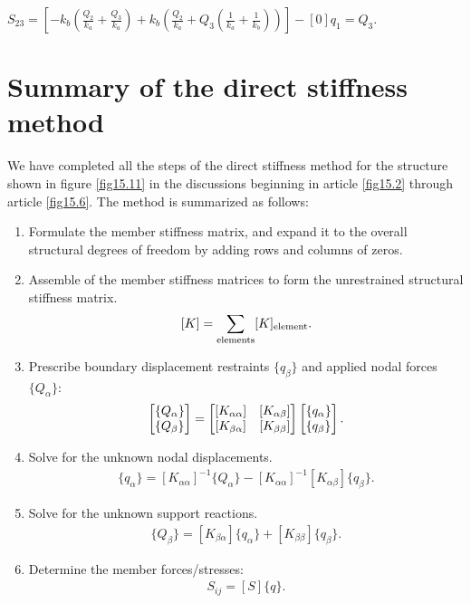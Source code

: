 \documentclass{AeroStructure-ERJohnson}
\begin{document}
$S_{23}=\left[-k_{b}\left(\frac{Q_{2}}{k_{a}}+\frac{Q_{3}}{k_{a}}\right)+k_{b}\left(\frac{Q_{2}}{k_{a}}+Q_{3}\left(\frac{1}{k_{a}}+\frac{1}{k_{b}}\right)\right)\right]-[0] q_{1}=Q_{3}$.

\section{Summary of the direct stiffness method}\label{sec15.7}
We have completed all the steps of the direct stiffness method for the structure shown in figure \ref{fig15.11} in the discussions beginning in article \ref{fig15.2} through article \ref{fig15.6}. The method is summarized as follows:
\begin{enumerate}
\item Formulate the member stiffness matrix, and expand it to the overall structural degrees of freedom by adding rows and columns of zeros.

\item Assemble of the member stiffness matrices to form the unrestrained structural stiffness matrix.
\begin{align}\label{eq15.47}
[K]=\sum_{{\rm elements }}[K]_{{\rm element}}.
\end{align}
\item Prescribe boundary displacement restraints $\{q_{\beta}\}$ and applied nodal forces $\{Q_{\alpha}\}$:
\begin{align}\label{eq15.48}
\left[\begin{array}{@{}l@{}} \{Q_{\alpha}\} \\ \{Q_{\beta}\}\end{array}\right]
=
\left[\begin{array}{@{}cc@{}} [K_{\alpha \alpha}] & [K_{\alpha \beta}] \\
{[}K_{\beta \alpha}] & [K_{\beta \beta}]\end{array}\right]
\left[
\begin{array}{@{}l@{}}
\{q_{\alpha}\} \\
\{q_{\beta}\}
\end{array}\right].
\end{align}
\item Solve for the unknown nodal displacements.
\begin{align}\label{eq15.49}
\{q_{\alpha}\}=[K_{\alpha \alpha}]^{-1}\{Q_{\alpha}\}-[K_{\alpha \alpha}]^{-1}[K_{\alpha \beta}]\{q_{\beta}\}.
\end{align}
\item Solve for the unknown support reactions.
\begin{align}\label{eq15.50}
\{Q_{\beta}\}=[K_{\beta \alpha}]\{q_{\alpha}\}+\left[K_{\beta \beta}\right]\{q_{\beta}\}.
\end{align}
\item Determine the member forces/stresses:
\begin{align}\label{eq15.51}
S_{i j}=[S]\{q\}.
\end{align}
\end{enumerate}
\end{document}
